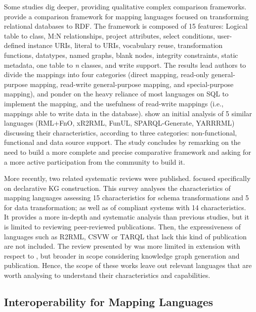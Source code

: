 Some studies dig deeper, providing qualitative complex comparison frameworks. \cite{hert2011comparison} provide a comparison framework for mapping languages focused on transforming relational databases to RDF. The framework is composed of 15 features: Logical table to class, M:N relationships, project attributes, select conditions, user-defined instance URIs, literal to URIs, vocabulary reuse, transformation functions, datatypes, named graphs, blank nodes, integrity constraints, static metadata, one table to \textit{n} classes, and write support. 
The results lead authors to divide the mappings into four categories (direct mapping, read-only general-purpose mapping, read-write general-purpose mapping, and special-purpose mapping), and ponder on the heavy reliance of most languages on SQL to implement the mapping, and the usefulness of read-write mappings (i.e., mappings able to write data in the database). \cite{DeMeester2019comparison} show an initial analysis of 5 similar languages (RML+FnO, xR2RML, FunUL, SPARQL-Generate, YARRRML) discussing their characteristics, according to three categories: non-functional, functional and data source support. The study concludes by remarking on the need to build a more complete and precise comparative framework and asking for a more active participation from the community to build it. 

More recently, two related systematic reviews were published. \cite{vanassche2023survey} focused specifically on declarative KG construction. This survey analyses the characteristics of mapping languages assessing 15 characteristics for schema transformations and 5 for data transformation; as well as of compliant systems with 14 characteristics. It provides a more in-depth and systematic analysis than previous studies, but it is limited to reviewing peer-reviewed publications. Then, the expressiveness of languages such as R2RML, CSVW or TARQL that lack this kind of publication are not included. The review presented by \cite{ryen2022kgreview} was more limited in extension with respect to \cite{vanassche2023survey}, but broader in scope considering knowledge graph generation and publication. %
Hence, the scope of these works leave out relevant languages that are worth analysing to understand their characteristics and capabilities.

\subsection{Interoperability for Mapping Languages}
\label{sec:chp2_interoperability}

